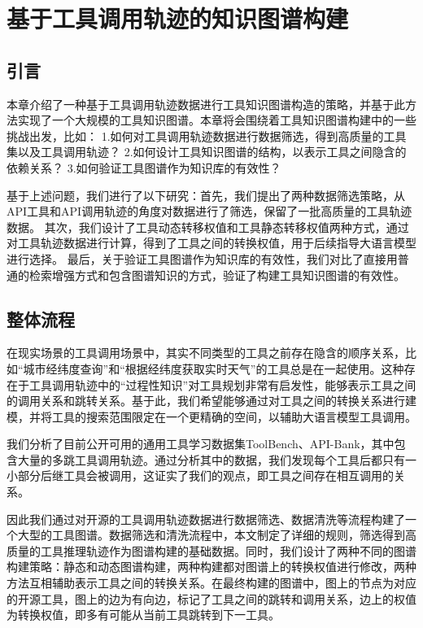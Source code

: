 
\chapter{基于工具调用轨迹的知识图谱构建}

\section{引言}

本章介绍了一种基于工具调用轨迹数据进行工具知识图谱构造的策略，并基于此方法实现了一个大规模的工具知识图谱。本章将会围绕着工具知识图谱构建中的一些挑战出发，比如：
1.如何对工具调用轨迹数据进行数据筛选，得到高质量的工具集以及工具调用轨迹？
2.如何设计工具知识图谱的结构，以表示工具之间隐含的依赖关系？
3.如何验证工具图谱作为知识库的有效性？

基于上述问题，我们进行了以下研究：首先，我们提出了两种数据筛选策略，从API工具和API调用轨迹的角度对数据进行了筛选，保留了一批高质量的工具轨迹数据。
其次，我们设计了工具动态转移权值和工具静态转移权值两种方式，通过对工具轨迹数据进行计算，得到了工具之间的转换权值，用于后续指导大语言模型进行选择。
最后，关于验证工具图谱作为知识库的有效性，我们对比了直接用普通的检索增强方式和包含图谱知识的方式，验证了构建工具知识图谱的有效性。

\section{整体流程}

在现实场景的工具调用场景中，其实不同类型的工具之前存在隐含的顺序关系，比如“城市经纬度查询”和“根据经纬度获取实时天气”的工具总是在一起使用。这种存在于工具调用轨迹中的“过程性知识”对工具规划非常有启发性，能够表示工具之间的调用关系和跳转关系。基于此，我们希望能够通过对工具之间的转换关系进行建模，并将工具的搜索范围限定在一个更精确的空间，以辅助大语言模型工具调用。

我们分析了目前公开可用的通用工具学习数据集ToolBench、API-Bank，其中包含大量的多跳工具调用轨迹。通过分析其中的数据，我们发现每个工具后都只有一小部分后继工具会被调用，这证实了我们的观点，即工具之间存在相互调用的关系。

因此我们通过对开源的工具调用轨迹数据进行数据筛选、数据清洗等流程构建了一个大型的工具图谱。数据筛选和清洗流程中，本文制定了详细的规则，筛选得到高质量的工具推理轨迹作为图谱构建的基础数据。同时，我们设计了两种不同的图谱构建策略：静态和动态图谱构建，两种构建都对图谱上的转换权值进行修改，两种方法互相辅助表示工具之间的转换关系。在最终构建的图谱中，图上的节点为对应的开源工具，图上的边为有向边，标记了工具之间的跳转和调用关系，边上的权值为转换权值，即多有可能从当前工具跳转到下一工具。


